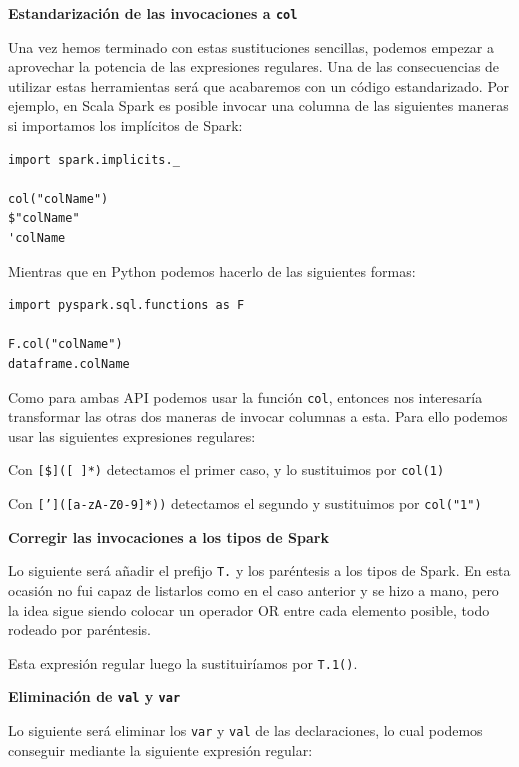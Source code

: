 \documentclass[12pt,twoside,titlepage]{report}
\begin{document}
\textbf{Estandarización de las invocaciones a \texttt{col}}

Una vez hemos terminado con estas sustituciones sencillas, podemos empezar a aprovechar la potencia de las expresiones regulares. Una de las consecuencias de utilizar estas herramientas será que acabaremos con un código estandarizado. Por ejemplo, en Scala Spark es posible invocar una columna de las siguientes maneras si importamos los implícitos de Spark:

\begin{lstlisting}
import spark.implicits._
	
col("colName")
$"colName"
'colName
\end{lstlisting}

Mientras que en Python podemos hacerlo de las siguientes formas:

\begin{lstlisting}
import pyspark.sql.functions as F
	
F.col("colName")
dataframe.colName
\end{lstlisting}

Como para ambas API podemos usar la función \texttt{col}, entonces nos interesaría transformar las otras dos maneras de invocar columnas a esta. Para ello podemos usar las siguientes expresiones regulares:
\begin{compactitem}
	\item Con \texttt{[\$]([ ]*)} detectamos el primer caso, y lo sustituimos por \texttt{col(1)}
	\item Con \texttt{[']([a-zA-Z0-9]*))} detectamos el segundo y sustituimos por \texttt{col("1")}
\end{compactitem}

\textbf{Corregir las invocaciones a los tipos de Spark}

Lo siguiente será añadir el prefijo \texttt{T.} y los paréntesis a los tipos de Spark. En esta ocasión no fui capaz de listarlos como en el caso anterior y se hizo a mano, pero la idea sigue siendo colocar un operador OR entre cada elemento posible, todo rodeado por paréntesis.

Esta expresión regular luego la sustituiríamos por \texttt{T.1()}.


\textbf{Eliminación de \texttt{val} y \texttt{var}}

Lo siguiente será eliminar los \texttt{var} y \texttt{val} de las declaraciones, lo cual podemos conseguir mediante la siguiente expresión regular:
\end{document}
